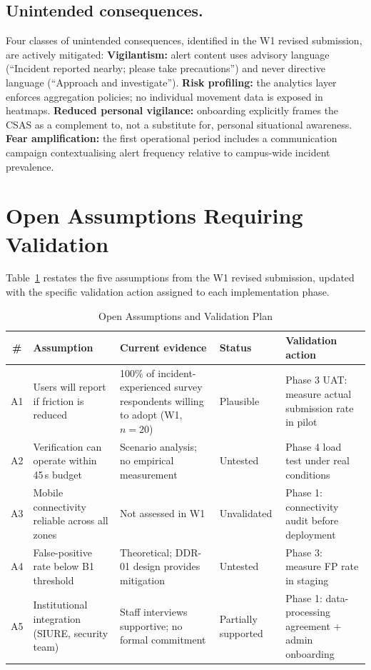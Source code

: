 \documentclass[12pt,a4paper]{article}
\begin{document}
\subsection{Unintended consequences.}
Four classes of unintended consequences, identified in the W1 revised
submission, are actively mitigated:
\textbf{Vigilantism:} alert content uses advisory language
(``Incident reported nearby; please take precautions'') and never
directive language (``Approach and investigate'').
\textbf{Risk profiling:} the analytics layer enforces aggregation
policies; no individual movement data is exposed in heatmaps.
\textbf{Reduced personal vigilance:} onboarding explicitly frames
the CSAS as a complement to, not a substitute for, personal
situational awareness.
\textbf{Fear amplification:} the first operational period includes
a communication campaign contextualising alert frequency relative
to campus-wide incident prevalence.

\section{Open Assumptions Requiring Validation}
\label{sec:assumptions}

Table~\ref{tab:assumptions} restates the five assumptions from the
W1 revised submission, updated with the specific validation action
assigned to each implementation phase.

\begin{table}[h]
\caption{Open Assumptions and Validation Plan}
\label{tab:assumptions}
\centering
\begin{tabularx}{\textwidth}{clXlX}
\toprule
\textbf{\#} & \textbf{Assumption} & \textbf{Current evidence} & \textbf{Status} & \textbf{Validation action} \\
\midrule
A1 & Users will report if friction is reduced & 100\% of incident-experienced survey respondents willing to adopt (W1, $n=20$) & Plausible & Phase 3 UAT: measure actual submission rate in pilot \\
A2 & Verification can operate within 45\,s budget & Scenario analysis; no empirical measurement & Untested & Phase 4 load test under real conditions \\
A3 & Mobile connectivity reliable across all zones & Not assessed in W1 & Unvalidated & Phase 1: connectivity audit before deployment \\
A4 & False-positive rate below B1 threshold & Theoretical; DDR-01 design provides mitigation & Untested & Phase 3: measure FP rate in staging \\
A5 & Institutional integration (SIURE, security team) & Staff interviews supportive; no formal commitment & Partially supported & Phase 1: data-processing agreement + admin onboarding \\
\bottomrule
\end{tabularx}
\end{table}
\end{document}
